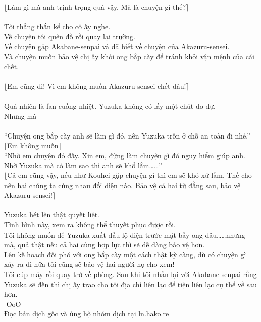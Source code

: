 \documentclass[12pt,a4paper, twosides]{book}
\begin{document}
$\lfloor$Làm gì mà anh trịnh trọng quá vậy. Mà là chuyện gì thế?$\rceil$\\
\\
Tôi thẳng thắn kể cho cô ấy nghe.\\
Về chuyện tôi quên đồ rồi quay lại trường.\\
Về chuyện gặp Akabane-senpai và đã biết về chuyện của Akazuru-sensei.\\
Và chuyện muốn bảo vệ chị ấy khỏi ong bắp cày để tránh khỏi vận mệnh của cái chết.\\
\\
$\lfloor$Em cũng đi! Vì em không muốn Akazuru-sensei chết đâu!$\rceil$\\
\\
Quả nhiên là fan cuồng nhiệt. Yuzuka không có lấy một chút do dự.\\
Nhưng mà—\\
\\
“Chuyện ong bắp cày anh sẽ làm gì đó, nên Yuzuka trốn ở chỗ an toàn đi nhé.”\\
$\lfloor$Em không muốn$\rceil$\\
“Nhờ em chuyện đó đấy. Xin em, đừng làm chuyện gì đó nguy hiểm giúp anh. Nhỡ Yuzuka mà có làm sao thì anh sẽ khổ lắm……”\\
$\lfloor$Cả em cũng vậy, nếu như Kouhei gặp chuyện gì thì em sẽ khó xử lắm. Thế cho nên hai chúng ta cùng nhau đối diện nào. Bảo vệ cả hai từ đằng sau, bảo vệ Akazuru-sensei!$\rceil$\\
\\
Yuzuka hét lên thật quyết liệt.\\
Tình hình này, xem ra không thể thuyết phục được rồi.\\
Tôi không muốn để Yuzuka xuất đầu lộ diện trước mặt bầy ong đâu……nhưng mà, quả thật nếu cả hai cùng hợp lực thì sẽ dễ dàng bảo vệ hơn.\\
Lên kế hoạch đối phó với ong bắp cày một cách thật kỹ càng, dù có chuyện gì xảy ra đi nữa tôi cũng sẽ bảo vệ hai người họ cho xem!\\
Tôi cúp máy rồi quay trở về phòng. Sau khi tôi nhắn lại với Akabane-senpai rằng Yuzuka sẽ đến thì chị ấy trao cho tôi địa chỉ liên lạc để tiện liên lạc cụ thể về sau hơn.\\
-OoO-\\
Đọc bản dịch gốc và ủng hộ nhóm dịch tại \href{https://ln.hako.re/}{ln.hako.re}\\
\newpage
\end{document}
